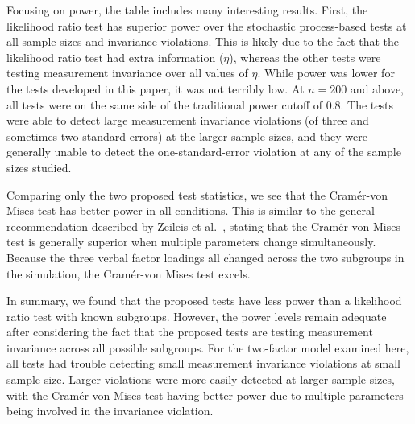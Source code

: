 \documentclass[man]{apa}
\begin{document}
Focusing on power, the table includes many interesting results.
First, the likelihood ratio test has superior power over the stochastic
process-based tests at all sample sizes and invariance violations.
This is likely due to the fact that the likelihood ratio test had
extra information ($\eta$), whereas the other tests
were testing measurement invariance over all values
of $\eta$.  While power was lower for the tests developed in this
paper, it was not terribly low.  At $n=200$ and above, all tests were
on the same side of the traditional power cutoff of 0.8.  The tests
were able to detect large measurement invariance violations (of three
and sometimes two standard errors) at the larger sample sizes, and
they were generally unable to detect the one-standard-error violation
at any of the sample sizes studied.

Comparing only the two proposed test statistics, we see that the
Cram\'{e}r-von Mises test has better power in all conditions.  This is
similar to the general recommendation described by Zeileis et al.\
\citeyear{ZeiSha10}, stating that the Cram\'{e}r-von Mises test
is generally superior when multiple parameters change simultaneously.
Because the three verbal factor loadings all changed
across the two subgroups in the simulation, the Cram\'{e}r-von Mises
test excels.

In summary, we found that the proposed tests have less power than a
likelihood ratio test with known subgroups.  However, the power levels
remain adequate after considering the fact that the proposed tests are
testing measurement invariance across all possible subgroups.  For the
two-factor model examined here, all tests had trouble detecting small
measurement invariance violations at small sample size.  Larger
violations were more easily detected at larger sample sizes, with the
Cram\'{e}r-von Mises test having better power due to multiple
parameters being involved in the invariance violation.
\end{document}
